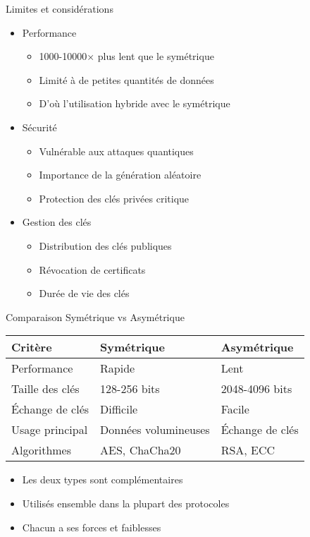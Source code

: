 \begin{frame}{Limites et considérations}
  \begin{itemize}
    \item Performance
      \begin{itemize}
        \item 1000-10000× plus lent que le symétrique
        \item Limité à de petites quantités de données
        \item D'où l'utilisation hybride avec le symétrique
      \end{itemize}
    \item Sécurité
      \begin{itemize}
        \item Vulnérable aux attaques quantiques
        \item Importance de la génération aléatoire
        \item Protection des clés privées critique
      \end{itemize}
    \item Gestion des clés
      \begin{itemize}
        \item Distribution des clés publiques
        \item Révocation de certificats
        \item Durée de vie des clés
      \end{itemize}
  \end{itemize}
\end{frame}

\begin{frame}{Comparaison Symétrique vs Asymétrique}
  \begin{center}
    \begin{tabular}{|l|l|l|}
      \hline
      \textbf{Critère} & \textbf{Symétrique} & \textbf{Asymétrique} \\
      \hline
      Performance & Rapide & Lent \\
      Taille des clés & 128-256 bits & 2048-4096 bits \\
      Échange de clés & Difficile & Facile \\
      Usage principal & Données volumineuses & Échange de clés \\
      Algorithmes & AES, ChaCha20 & RSA, ECC \\
      \hline
    \end{tabular}
  \end{center}

  \begin{itemize}
    \item Les deux types sont complémentaires
    \item Utilisés ensemble dans la plupart des protocoles
    \item Chacun a ses forces et faiblesses
  \end{itemize}
\end{frame}